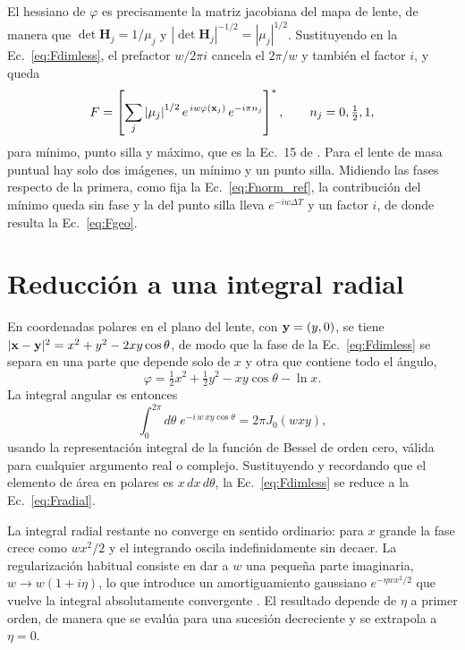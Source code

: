 \documentclass[11pt,a4paper,openany]{book}
\begin{document}
El hessiano de $\varphi$ es precisamente la matriz jacobiana del mapa de
lente, de manera que $\det\mathbf{H}_j=1/\mu_j$ y
$|\det\mathbf{H}_j|^{-1/2}=|\mu_j|^{1/2}$. Sustituyendo en la
Ec.~\eqref{eq:Fdimless}, el prefactor $w/2\pi i$ cancela el $2\pi/w$ y
tambi\'en el factor $i$, y queda
\begin{equation}
  F=\left[\sum_j\left|\mu_j\right|^{1/2}
  e^{\,iw\varphi(\vb x_j)}\,e^{-i\pi n_j}\right]^{*},
  \qquad n_j=0,\tfrac12,1 ,
  \label{eq:morse}
\end{equation}
para m\'inimo, punto silla y m\'aximo, que es la Ec.~15 de
\citet{Takahashi2003}. Para el lente de masa puntual hay solo dos im\'agenes,
un m\'inimo y un punto silla. Midiendo las fases respecto de la primera, como
fija la Ec.~\eqref{eq:Fnorm_ref}, la contribuci\'on del m\'inimo queda sin
fase y la del punto silla lleva $e^{-iw\Delta T}$ y un factor $i$, de donde
resulta la Ec.~\eqref{eq:Fgeo}.

\section{Reducci\'on a una integral radial}
\label{ap:radial}

En coordenadas polares en el plano del lente, con $\vb y=(y,0)$, se tiene
$|\vb x-\vb y|^{2}=x^{2}+y^{2}-2xy\cos\theta$, de modo que la fase de la
Ec.~\eqref{eq:Fdimless} se separa en una parte que depende solo de $x$ y otra
que contiene todo el \'angulo,
\begin{equation}
  \varphi=\tfrac12x^{2}+\tfrac12y^{2}-xy\cos\theta-\ln x .
  \label{eq:polar_phase}
\end{equation}
La integral angular es entonces
\begin{equation}
  \int_0^{2\pi}d\theta\;e^{-i\,w\,xy\cos\theta}=2\pi J_0(wxy) ,
  \label{eq:angular_integral}
\end{equation}
usando la representaci\'on integral de la funci\'on de Bessel de orden cero,
v\'alida para cualquier argumento real o complejo. Sustituyendo y recordando
que el elemento de \'area en polares es $x\,dx\,d\theta$, la
Ec.~\eqref{eq:Fdimless} se reduce a la Ec.~\eqref{eq:Fradial}.

La integral radial restante no converge en sentido ordinario: para $x$ grande
la fase crece como $wx^{2}/2$ y el integrando oscila indefinidamente sin
decaer. La regularizaci\'on habitual consiste en dar a $w$ una peque\~na parte
imaginaria, $w\to w(1+i\eta)$, lo que introduce un amortiguamiento gaussiano
$e^{-\eta wx^{2}/2}$ que vuelve la integral absolutamente convergente
\citep{UlmerGoodman1995}. El resultado depende de $\eta$ a primer orden, de
manera que se eval\'ua para una sucesi\'on decreciente y se extrapola a
$\eta=0$.
\end{document}
